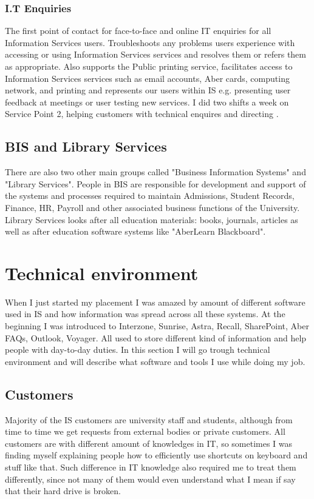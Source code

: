 \documentclass[10pt,a4paper,headinclude=true]{report}
\begin{document}
\subsection{I.T Enquiries}
The first point of contact for face-to-face and online IT enquiries for all Information Services users. Troubleshoots any problems users experience with accessing or using Information Services services and resolves them or refers them as appropriate. Also supports the Public printing service, facilitates access to Information Services services such as email accounts, Aber cards, computing network, and printing and represents our users within IS e.g. presenting user feedback at meetings or user testing new services. I did two shifts a week on Service Point 2, helping customers with technical enquires and directing .

\section{BIS and Library Services}
There are also two other main groups called "Business Information Systems" and "Library Services". People in BIS are  responsible for development and support of the systems and processes required to maintain Admissions, Student Records, Finance, HR, Payroll and other associated business functions of the University. Library Services looks after all education materials: books, journals, articles as well as after education software systems like "AberLearn Blackboard".

\chapter{Technical environment}
When I just started my placement I was amazed by amount of different software used in IS and how information was spread across all these systems. At the beginning I was introduced to Interzone, Sunrise, Astra, Recall, SharePoint, Aber FAQs, Outlook, Voyager. All used to store different kind of information and help people with day-to-day duties. In this section I will go trough technical environment and will describe what software and tools I use while doing my job.
\section{Customers}
Majority of the IS customers are university staff and students, although from time to time we get requests from external bodies or private customers. All customers are with different amount of knowledges in IT, so sometimes I was finding myself explaining people how to efficiently use shortcuts on keyboard and stuff like that. Such difference in IT knowledge also required me to treat them differently, since not many of them would even understand what I mean if say that their hard drive is broken.
\end{document}
